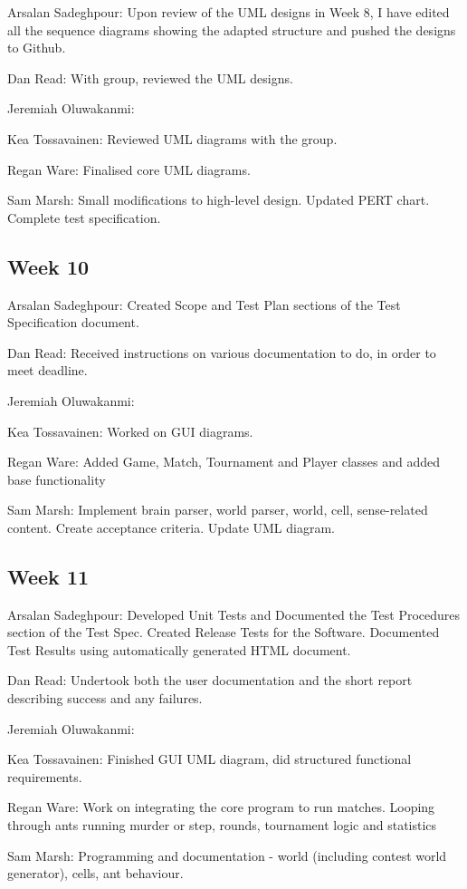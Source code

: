 \documentclass[11pt]{article}
\begin{document}
Arsalan Sadeghpour: Upon review of the UML designs in Week 8, I have edited all the sequence diagrams showing the adapted structure and pushed the designs to Github.

Dan Read: With group, reviewed the UML designs.

Jeremiah Oluwakanmi:

Kea Tossavainen: Reviewed UML diagrams with the group.

Regan Ware: Finalised core UML diagrams.

Sam Marsh: Small modifications to high-level design. Updated PERT chart. Complete test specification.

\subsection{Week 10}

Arsalan Sadeghpour: Created Scope and Test Plan sections of the Test Specification document.

Dan Read: Received instructions on various documentation to do, in order to meet deadline.

Jeremiah Oluwakanmi:

Kea Tossavainen: Worked on GUI diagrams.

Regan Ware: Added Game, Match, Tournament and Player classes and added base functionality

Sam Marsh: Implement brain parser, world parser, world, cell, sense-related content. Create acceptance criteria. Update UML diagram.

\subsection{Week 11}

Arsalan Sadeghpour: Developed Unit Tests and Documented the Test Procedures section of the Test Spec. Created Release Tests for the Software. Documented Test Results using automatically generated HTML document.

Dan Read: Undertook both the user documentation and the short report describing success and any failures.

Jeremiah Oluwakanmi:

Kea Tossavainen: Finished GUI UML diagram, did structured functional requirements.

Regan Ware: Work on integrating the core program to run matches. Looping through ants running murder or step, rounds, tournament logic and statistics

Sam Marsh: Programming and documentation - world (including contest world generator), cells, ant behaviour.
\end{document}
